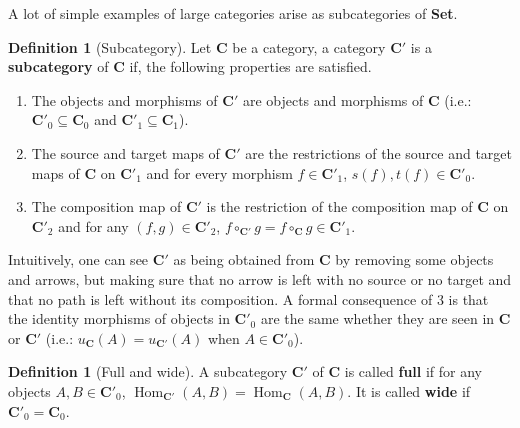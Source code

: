 \documentclass{article}
\theoremstyle{definition}
\newtheorem{defn}[thm]{Definition}
\theoremstyle{remark}
\DeclareMathOperator{\Hom}{Hom}
\begin{document}
A lot of simple examples of large categories arise as subcategories of \textbf{Set}.
\begin{defn}[Subcategory]
	Let $\mathbf{C}$ be a category, a category $\mathbf{C}'$ is a \textbf{subcategory} of $\mathbf{C}$ if, the following properties are satisfied.
	\begin{enumerate}
		\item The objects and morphisms of $\mathbf{C}'$ are objects and morphisms of $\mathbf{C}$ (i.e.: $\mathbf{C}'_0 \subseteq \mathbf{C}_0$ and $\mathbf{C}'_1 \subseteq \mathbf{C}_1$).
		\item The source and target maps of $\mathbf{C}'$ are the restrictions of the source and target maps of $\mathbf{C}$ on $\mathbf{C}'_1$ and for every morphism $f \in \mathbf{C}'_1$, $s(f), t(f) \in \mathbf{C}'_0$.
		\item The composition map of $\mathbf{C}'$ is the restriction of the composition map of $\mathbf{C}$ on $\mathbf{C}'_2$ and for any $(f,g) \in \mathbf{C}'_2$, $f\circ_{\mathbf{C}'} g = f \circ_{\mathbf{C}} g \in \mathbf{C}'_1$. 
	\end{enumerate}
	Intuitively, one can see $\mathbf{C}'$ as being obtained from $\mathbf{C}$ by removing some objects and arrows, but making sure that no arrow is left with no source or no target and that no path is left without its composition. A formal consequence of 3 is that the identity morphisms of objects in $\mathbf{C}'_0$ are the same whether they are seen in $\mathbf{C}$ or $\mathbf{C}'$ (i.e.: $u_{\mathbf{C}}(A) = u_{\mathbf{C}'}(A)$ when $A \in \mathbf{C}'_0$).
\end{defn}
\begin{defn}[Full and wide]
	A subcategory $\mathbf{C}'$ of $\mathbf{C}$ is called \textbf{full} if for any objects $A,B \in \mathbf{C}'_0$, $\Hom_{\mathbf{C}'}(A,B) = \Hom_{\mathbf{C}}(A,B)$. It is called \textbf{wide} if $\mathbf{C}'_0 = \mathbf{C}_0$.
\end{defn}
\end{document}
